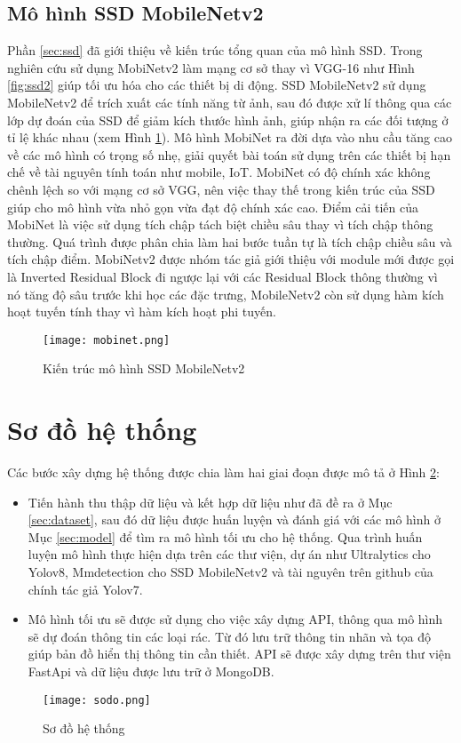 \documentclass[../the.tex]{subfiles}
\begin{document}
\subsection{Mô hình SSD MobileNetv2}
{\fontsize{13}{12} \selectfont

	Phần \ref{sec:ssd} đã giới thiệu về kiến trúc tổng quan của mô hình SSD. Trong nghiên cứu sử dụng MobiNetv2 \cite{sandler2019mobilenetv2} làm mạng cơ sở thay vì VGG-16 như Hình \ref{fig:ssd2} giúp tối ưu hóa cho các thiết bị di động. SSD MobileNetv2 sử dụng MobileNetv2 để trích xuất các tính năng từ ảnh, sau đó được xử lí thông qua các lớp dự đoán của SSD để giảm kích thước hình ảnh, giúp nhận ra các đối tượng ở tỉ lệ khác nhau (xem Hình \ref{fig:mobinet}).
	Mô hình MobiNet ra đời dựa vào nhu cầu tăng cao về các mô hình có trọng số nhẹ, giải quyết bài toán sử dụng trên các thiết bị hạn chế về tài nguyên tính toán như mobile, IoT. MobiNet có độ chính xác không chênh lệch so với mạng cơ sở VGG, nên việc thay thế trong kiến trúc của SSD giúp cho mô hình vừa nhỏ gọn vừa đạt độ chính xác cao.
	Điểm cải tiến của MobiNet là việc sử dụng tích chập tách biệt chiều sâu thay vì tích chập thông thường. Quá trình được phân chia làm hai bước tuần tự là tích chập chiều sâu và tích chập điểm.
	MobiNetv2 được nhóm tác giả giới thiệu với module mới được gọi là Inverted Residual Block đi ngược lại với các Residual Block thông thường vì nó tăng độ sâu trước khi học các đặc trưng, MobileNetv2 còn sử dụng hàm kích hoạt tuyến tính thay vì hàm kích hoạt phi tuyến.

}

\begin{figure}[H]
	\centering
	\texttt{[image: mobinet.png]}
	\caption{Kiến trúc mô hình SSD MobileNetv2}
	\label{fig:mobinet}
\end{figure}

\section{Sơ đồ hệ thống}
\label{sec:sodo}
{\fontsize{13}{12} \selectfont

	Các bước xây dựng hệ thống được chia làm hai giai đoạn được mô tả ở Hình \ref{fig:sodo}:

	\begin{itemize}
		\item Tiến hành thu thập dữ liệu và kết hợp dữ liệu như đã đề ra ở Mục \ref{sec:dataset}, sau đó dữ liệu được huấn luyện và đánh giá với các mô hình ở Mục \ref{sec:model} để tìm ra mô hình tối ưu cho hệ thống.
		      Qua trình huấn luyện mô hình thực hiện dựa trên các thư viện, dự án như Ultralytics cho Yolov8, Mmdetection cho SSD MobileNetv2 và tài nguyên trên github của chính tác giả Yolov7.
		\item Mô hình tối ưu sẽ được sử dụng cho việc xây dựng API, thông qua mô hình sẽ dự đoán thông tin các loại rác. Từ đó lưu trữ thông tin nhãn và tọa độ giúp bản đồ hiển thị thông tin cần thiết.
		      API sẽ được xây dựng trên thư viện FastApi và dữ liệu được lưu trữ ở MongoDB.
	\end{itemize}

}

\begin{figure}[H]
	\centering
	\texttt{[image: sodo.png]}
	\caption{Sơ đồ hệ thống}
	\label{fig:sodo}
\end{figure}
\end{document}

